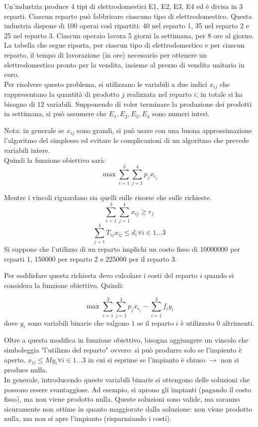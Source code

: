 \documentclass{article}
\begin{document}
Un’industria produce 4 tipi di elettrodomestici E1, E2, E3, E4 ed è divisa
in 3 reparti. Ciascun reparto può fabbricare ciascuno tipo di elettrodomestico.
Questa industria dispone di 100 operai così ripartiti: 40 nel reparto 1, 35 nel
reparto 2 e 25 nel reparto 3. Ciascun operaio lavora 5 giorni la settimana, 
per 8 ore al giorno. La tabella che segue riporta, per ciascun tipo di 
elettrodomestico e per ciascun reparto, il tempo di lavorazione (in ore) 
necessario per ottenere un elettrodomestico pronto per la vendita, 
insieme al prezzo di vendita unitario in euro.\\

Per risolvere questo problema, si utilizzano le variabili a due indici $x_{ij}$
che rappresentano la quantità di prodotto $j$ realizzata nel reparto $i$; in 
totale si ha bisogno di $12$ variabili. Supponendo di voler terminare la 
produzione dei prodotti in settimana, si può assumere che $E_1,E_2,E_3,E_4$ 
sono numeri interi.

Nota: in generale se $x_{ij}$ sono grandi, si può usare con una buona
approssimazione l'algoritmo del simplesso ed evitare le complicazioni di un 
algoritmo che prevede variabili intere.\\

Quindi la funzione obiettivo sarà:
$$  \max \sum_{i=1}^{3}\sum_{j=1}^{4} p_jx_{i_j}$$

Mentre i vincoli riguardano sia quelli sulle risorse che sulle richieste.
$$  \sum_{i=1}^{3}\sum_{j=1}^{4} x_{ij} \geq r_j$$
$$  \sum_{j=1}^{4} T_{ij}x_{ij} \leq d_i \forall i \in {1...3}$$
Si suppone che l'utilizzo di un reparto implichi un costo fisso di 
10000000 per reparti 1, 150000 per reparto 2 e 225000 per il reparto 3.

Per soddisfare questa richiesta devo calcolare i costi del reparto $i$ quando 
si considera la funzione obiettivo. Quindi:


$$  \max \sum_{i=1}^{3}\sum_{j=1}^{4} p_jx_{i_j} - \sum_{i=1}^3f_iy_i$$
dove $y_i$ sono variabili binarie che valgono $1$ se il reparto $i$ è utilizzato 
$0$ altrimenti.

Oltre a questa modifica in funzione obiettivo, bisogna aggiungere un vincolo 
che simboleggia "l'utilizzo del reparto" ovvero: si può produrre solo se 
l'impiento è aperto. $x_{ij} \leq My_i \forall i \in {1...3}$ in cui si esprime 
se l'impianto è chiuso $\rightarrow$ non si produce nulla.\\

In generale, introducendo queste variabili binarie si ottengono delle soluzioni 
che possono essere svantaggiose. Ad esempio, si aprono gli impianti (pagando il 
costo fisso), ma non viene prodotto nulla. Queste soluzioni sono valide, ma 
saranno sicuramente non ottime in quanto maggiorate dalla soluzione: non viene 
prodotto nulla, ma non si apre l'impianto (risparmiando i costi).\\ 
\end{document}
